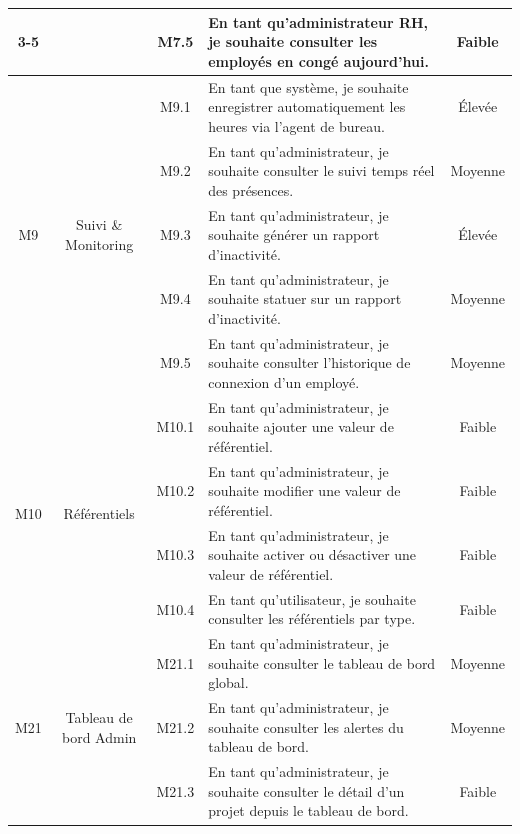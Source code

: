 \begin{longtable}{|c|c|c|p{7.2cm}|c|}
\cline{3-5}
 & & M7.5 & En tant qu'administrateur RH, je souhaite consulter les employés en congé aujourd'hui. & Faible \\
\hline
\multirow{5}{*}{M9} & \multirow{5}{*}{Suivi \& Monitoring} & M9.1 & En tant que système, je souhaite enregistrer automatiquement les heures via l'agent de bureau. & Élevée \\
\cline{3-5}
 & & M9.2 & En tant qu'administrateur, je souhaite consulter le suivi temps réel des présences. & Moyenne \\
\cline{3-5}
 & & M9.3 & En tant qu'administrateur, je souhaite générer un rapport d'inactivité. & Élevée \\
\cline{3-5}
 & & M9.4 & En tant qu'administrateur, je souhaite statuer sur un rapport d'inactivité. & Moyenne \\
\cline{3-5}
 & & M9.5 & En tant qu'administrateur, je souhaite consulter l'historique de connexion d'un employé. & Moyenne \\
\hline
\multirow{4}{*}{M10} & \multirow{4}{*}{Référentiels} & M10.1 & En tant qu'administrateur, je souhaite ajouter une valeur de référentiel. & Faible \\
\cline{3-5}
 & & M10.2 & En tant qu'administrateur, je souhaite modifier une valeur de référentiel. & Faible \\
\cline{3-5}
 & & M10.3 & En tant qu'administrateur, je souhaite activer ou désactiver une valeur de référentiel. & Faible \\
\cline{3-5}
 & & M10.4 & En tant qu'utilisateur, je souhaite consulter les référentiels par type. & Faible \\
\hline
\multirow{3}{*}{M21} & \multirow{3}{*}{Tableau de bord Admin} & M21.1 & En tant qu'administrateur, je souhaite consulter le tableau de bord global. & Moyenne \\
\cline{3-5}
 & & M21.2 & En tant qu'administrateur, je souhaite consulter les alertes du tableau de bord. & Moyenne \\
\cline{3-5}
 & & M21.3 & En tant qu'administrateur, je souhaite consulter le détail d'un projet depuis le tableau de bord. & Faible \\
\hline
\end{longtable}
